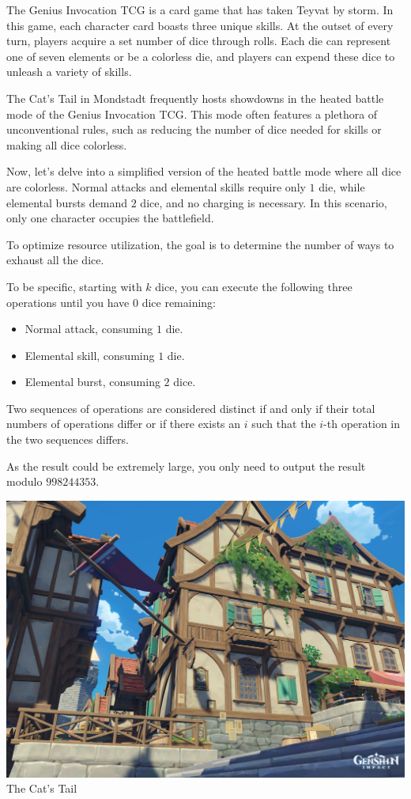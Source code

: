 The Genius Invocation TCG is a card game that has taken Teyvat by storm. In this game, each character card boasts three unique skills. At the outset of every turn, players acquire a set number of dice through rolls. Each die can represent one of seven elements or be a colorless die, and players can expend these dice to unleash a variety of skills.

The Cat's Tail in Mondstadt frequently hosts showdowns in the heated battle mode of the Genius Invocation TCG. This mode often features a plethora of unconventional rules, such as reducing the number of dice needed for skills or making all dice colorless.

Now, let's delve into a simplified version of the heated battle mode where all dice are colorless. Normal attacks and elemental skills require only $1$ die, while elemental bursts demand $2$ dice, and no charging is necessary. In this scenario, only one character occupies the battlefield.

To optimize resource utilization, the goal is to determine the number of ways to exhaust all the dice.

To be specific, starting with $k$ dice, you can execute the following three operations until you have $0$ dice remaining:

\begin{itemize}
\item Normal attack, consuming $1$ die.
\item Elemental skill, consuming $1$ die.
\item Elemental burst, consuming $2$ dice.
\end{itemize}

Two sequences of operations are considered distinct if and only if their total numbers of operations differ or if there exists an $i$ such that the $i$-th operation in the two sequences differs.

As the result could be extremely large, you only need to output the result modulo $998244353$.


\begin{center}
  \includegraphics[scale=0.15]{cattail.jpg} \\
  \small{The Cat's Tail}
\end{center}
